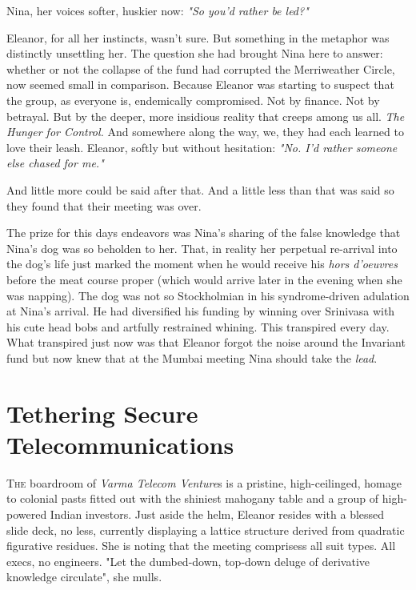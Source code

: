 \smallskip

Nina, her voices softer, huskier now: \textit{"So you’d rather be led?"}

\smallskip

Eleanor, for all her instincts, wasn’t sure. But something in the metaphor was distinctly unsettling her. The question she had brought Nina here to answer: whether or not the collapse of the fund had corrupted the Merriweather Circle, now seemed small in comparison. Because Eleanor was starting to suspect that the group, as everyone is, endemically compromised.
Not by finance. Not by betrayal. But by the deeper, more insidious reality that creeps among us all. \textit{The Hunger for Control.}
And somewhere along the way, we, they had each learned to love their leash. Eleanor, softly but without hesitation: \textit{"No. I'd rather someone else chased for me."}

\smallskip

And little more could be said after that. And a little less than that was said so they found that their meeting was over. 

\smallskip

The prize for this days endeavors was Nina's sharing of the false knowledge that Nina's dog was so beholden to her. That, in reality her perpetual re-arrival into the dog's life just marked the moment when he would receive his \textit{hors d'oeuvres} before the meat course proper (which would arrive later in the evening when she was napping). The dog was not so Stockholmian in his syndrome-driven adulation at Nina's arrival. He had diversified his funding by winning over Srinivasa with his cute head bobs and artfully restrained whining.  This transpired every day. What transpired just now was that Eleanor forgot the noise around the Invariant fund but now knew that at the Mumbai meeting Nina should take the \textit{lead}.
\newpage

\section*{Tethering Secure Telecommunications}

\lettrine{T}{he} boardroom of \textit{Varma Telecom Venture}s is a pristine, high-ceilinged, homage to colonial pasts fitted out with the shiniest  mahogany table and a group of high-powered Indian investors. Just aside the helm, Eleanor resides with a blessed slide deck, no less, currently displaying a lattice structure derived from quadratic figurative residues. She is noting that the meeting comprisess all suit types. All execs, no engineers. "Let the dumbed-down, top-down deluge of derivative knowledge circulate", she mulls.

